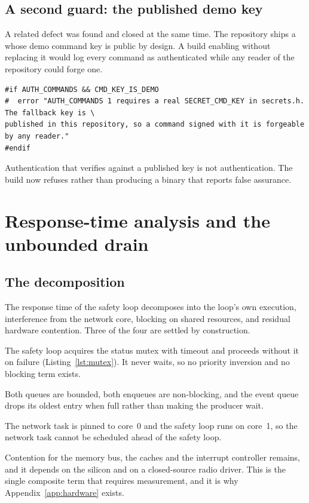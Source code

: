 \subsection{A second guard: the published demo key}

A related defect was found and closed at the same time. The repository ships a
 whose demo command key is public by design. A build enabling
 without replacing it would log every command as authenticated while any
reader of the repository could forge one.

\begin{lstlisting}[style=cpp,caption={Refusing the published key, \code{smart\_home.ino}}]
#if AUTH_COMMANDS && CMD_KEY_IS_DEMO
#  error "AUTH_COMMANDS 1 requires a real SECRET_CMD_KEY in secrets.h. The fallback key is \
published in this repository, so a command signed with it is forgeable by any reader."
#endif
\end{lstlisting}

Authentication that verifies against a published key is not authentication. The build now
refuses rather than producing a binary that reports false assurance.

\section{Response-time analysis and the unbounded drain}\label{sec:impl-rt}

\subsection{The decomposition}

The response time of the safety loop decomposes into the loop's own execution, interference
from the network core, blocking on shared resources, and residual hardware contention. Three of
the four are settled by construction.

\begin{description}[leftmargin=1.8em,itemsep=4pt]
  \item[Blocking is identically zero.] The safety loop acquires the status mutex with timeout
        \code{0} and proceeds without it on failure (Listing~\ref{lst:mutex}). It never waits,
        so no priority inversion and no blocking term exists.
  \item[Queue interference is bounded.] Both queues are bounded, both enqueues are
        non-blocking, and the event queue drops its oldest entry when full rather than making
        the producer wait.
  \item[Scheduling interference is bounded by core affinity.] The network task is pinned to
        core~0 and the safety loop runs on core~1, so the network task cannot be scheduled
        ahead of the safety loop.
  \item[Residual hardware contention cannot be settled analytically.] Contention for the
        memory bus, the caches and the interrupt controller remains, and it depends on the
        silicon and on a closed-source radio driver. This is the single composite term that
        requires measurement, and it is why Appendix~\ref{app:hardware} exists.
\end{description}

